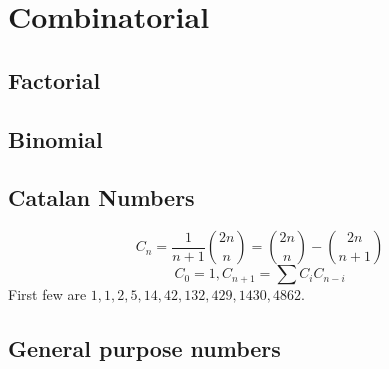 
\chapter{Combinatorial}

	\section{Factorial}
		

	\section{Binomial}

	\section{Catalan Numbers}
		$$C_n=\frac{1}{n+1}\binom{2n}{n}= \binom{2n}{n}-\binom{2n}{n+1}$$
		$$C_0=1, C_{n+1}=\sum C_iC_{n-i}$$
		First few are $1, 1, 2, 5, 14, 42, 132, 429, 1430, 4862$.


	\section{General purpose numbers}
